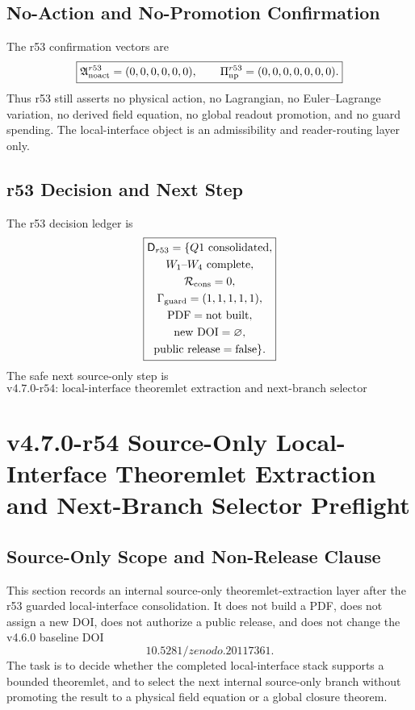 \subsection{No-Action and No-Promotion Confirmation}
\label{subsec:r53-no-action-no-promotion-confirmation}

The r53 confirmation vectors are
\[
\boxed{
\mathfrak A_{\rm noact}^{r53}=(0,0,0,0,0,0),
\qquad
\Pi_{\rm np}^{r53}=(0,0,0,0,0,0,0).
}
\]
Thus r53 still asserts no physical action, no Lagrangian, no Euler--Lagrange variation, no derived field equation, no global readout promotion, and no guard spending.  The local-interface object is an admissibility and reader-routing layer only.

\subsection{r53 Decision and Next Step}
\label{subsec:r53-decision-next-step}

The r53 decision ledger is
\[
\boxed{
\begin{gathered}
\mathsf D_{r53}
=
\{
Q1\text{ consolidated},\\
W_1\text{--}W_4\text{ complete},\\
\mathcal R_{\rm cons}=0,\\
\Gamma_{\rm guard}=(1,1,1,1,1),\\
\mathrm{PDF}=\mathrm{not\ built},\\
\mathrm{new\ DOI}=\varnothing,\\
\mathrm{public\ release}=\mathrm{false}
\}.
\end{gathered}
}
\]
The safe next source-only step is
\[
\boxed{
\text{v4.7.0-r54: local-interface theoremlet extraction and next-branch selector preflight.}
}
\]


\clearpage
\section{v4.7.0-r54 Source-Only Local-Interface Theoremlet Extraction and Next-Branch Selector Preflight}
\label{sec:r54-local-interface-theoremlet-selector-preflight}

\subsection{Source-Only Scope and Non-Release Clause}
\label{subsec:r54-source-only-scope-non-release}

This section records an internal source-only theoremlet-extraction layer after the r53 guarded local-interface consolidation.  It does not build a PDF, does not assign a new DOI, does not authorize a public release, and does not change the v4.6.0 baseline DOI
\[
\boxed{10.5281/zenodo.20117361.}
\]
The task is to decide whether the completed local-interface stack supports a bounded theoremlet, and to select the next internal source-only branch without promoting the result to a physical field equation or a global closure theorem.

